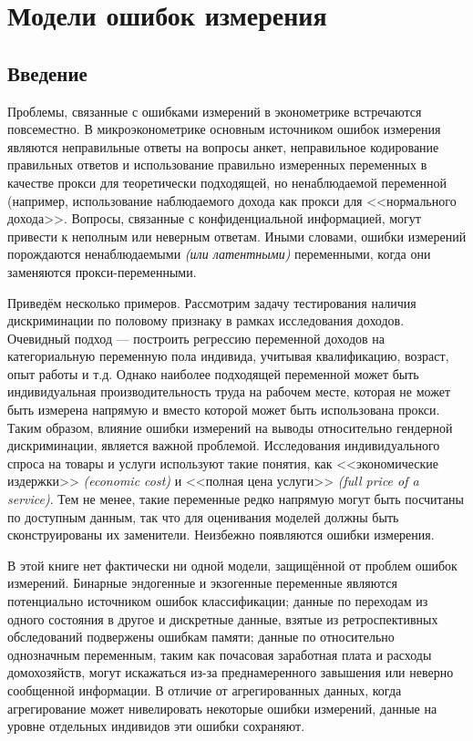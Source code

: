 

\chapter{Модели ошибок измерения}

\section{Введение}
Проблемы, связанные с ошибками измерений в эконометрике встречаются повсеместно. В микроэконометрике основным источником  ошибок измерения являются неправильные ответы на вопросы анкет, неправильное кодирование правильных ответов и использование правильно измеренных переменных в качестве прокси для теоретически подходящей, но ненаблюдаемой переменной (например, использование наблюдаемого дохода как прокси для <<нормального дохода>>.  Вопросы, связанные с конфиденциальной информацией, могут привести к неполным или неверным ответам. Иными словами, ошибки измерений порождаются ненаблюдаемыми \emph{(или латентными)} переменными, когда они заменяются прокси-переменными.

Приведём несколько примеров. Рассмотрим задачу тестирования наличия дискриминации по половому признаку в рамках исследования доходов. Очевидный подход --- построить регрессию переменной доходов на категориальную переменную пола индивида, учитывая квалификацию, возраст, опыт работы и т.д. Однако наиболее подходящей переменной может быть индивидуальная производительность труда на рабочем месте, которая не может быть измерена напрямую и вместо которой может быть использована прокси. Таким образом, влияние ошибки измерений на выводы относительно гендерной дискриминации, является важной проблемой. Исследования индивидуального спроса на товары и услуги используют такие понятия, как <<экономические издержки>> \emph{(economic cost)} и <<полная цена услуги>> \emph{(full price of a service)}. Тем не менее, такие переменные редко напрямую могут быть посчитаны по доступным данным, так что для оценивания моделей должны быть сконструированы их заменители.  Неизбежно появляются ошибки измерения.

В этой книге нет фактически ни одной модели, защищённой от проблем ошибок измерений. Бинарные  эндогенные и экзогенные переменные являются потенциально источником ошибок классификации; данные по переходам из одного состояния в другое и дискретные данные, взятые из ретроспективных обследований подвержены ошибкам памяти; данные по относительно однозначным переменным, таким как почасовая заработная плата и расходы домохозяйств, могут искажаться из-за преднамеренного завышения или неверно сообщенной информации. В отличие от агрегированных данных, когда агрегирование может нивелировать некоторые ошибки измерений, данные на уровне отдельных индивидов эти ошибки сохраняют.


